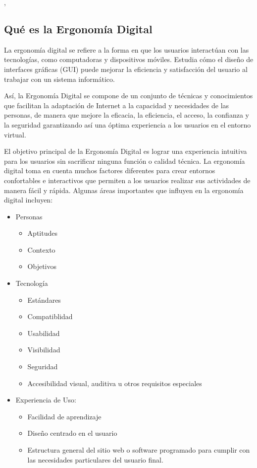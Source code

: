 \documentclass[12pt]{article}
\begin{document}
\cite{iberdrolaEsalud}, \cite{sanofiSaludDigital}

\subsection*{Qué es la Ergonomía Digital}
La ergonomía digital se refiere a la forma en que los usuarios interactúan con las tecnologías, como computadoras y dispositivos móviles. Estudia cómo el diseño de interfaces gráficas (GUI) puede mejorar la eficiencia y satisfacción del usuario al trabajar con un sistema informático.

Así, la Ergonomía Digital se compone de un conjunto de técnicas y conocimientos que facilitan la adaptación de Internet a la capacidad y necesidades de las personas, de manera que mejore la eficacia, la eficiencia, el acceso, la confianza y la seguridad garantizando así una óptima experiencia a los usuarios en el entorno virtual.

El objetivo principal de la Ergonomía Digital es lograr una experiencia intuitiva para los usuarios sin sacrificar ninguna función o calidad técnica. La ergonomía digital toma en cuenta muchos factores diferentes para crear entornos confortables e interactivos que permiten a los usuarios realizar sus actividades de manera fácil y rápida.
Algunas áreas importantes que influyen en la ergonomía digital incluyen:

\begin{itemize}
    \item Personas
        \begin{itemize}
            \item Aptitudes
            \item Contexto
            \item Objetivos
        \end{itemize}
    \item Tecnología
        \begin{itemize}
            \item Estándares
            \item Compatiblidad
            \item Usabilidad
            \item Visibilidad
            \item Seguridad
            \item Accesibilidad visual, auditiva u otros requisitos especiales
        \end{itemize}
    \item Experiencia de Uso:
        \begin{itemize}
            \item Facilidad de aprendizaje
            \item Diseño centrado en el usuario
            \item Estructura general del sitio web o software programado para cumplir con las necesidades particulares del usuario final.
        \end{itemize}
    
\end{itemize}
\end{document}
